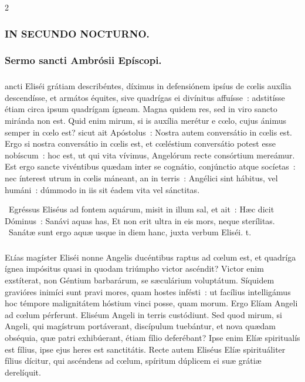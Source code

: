 \documentclass[9pt,twoside]{extarticle}
\begin{document}
\begin{multicols}{2}
\subsubsection*{\center \textsc{IN SECUNDO NOCTURNO.}}
\subsubsection*{\center Sermo sancti Ambrósii Epíscopi.}
\subsubsection*{\center {}}
ancti Eliséi grátiam describéntes, díximus in defensiónem ipsíus de cœlis auxília descendísse, et armátos équites, sive quadrígas ei divínitus affuísse~: adstitísse étiam circa ipsum quadrígam ígneam. Magna quidem res, sed in viro sancto miránda non est. Quid enim mirum, si is auxília merétur e cœlo, cujus ánimus semper in cœlo est? sicut ait Apóstolus~: Nostra autem conversátio in cœlis est. Ergo si nostra conversátio in cœlis est, et cœléstium conversátio potest esse nobíscum~: hoc est, ut qui vita vívimus, Angelórum recte consórtium mereámur. Est ergo sancte vivéntibus quædam inter se cognátio, conjúnctio atque socíetas~: nec ínterest utrum in cœlis máneant, an in terris~: Angélici sint hábitus, vel humáni~: dúmmodo in iis sit éadem vita vel sánctitas.

\begin{tightlist}{}
\item {}~Egréssus Eliséus ad fontem aquárum, misit in illum sal, et ait~: Hæc dicit Dóminus~: Sanávi aquas has, \textred{*} Et non erit ultra in eis mors, neque sterílitas. ~Sanátæ sunt ergo aquæ usque in diem hanc, juxta verbum Eliséi. t.
\end{tightlist}

\subsubsection*{\center {}}
\lettrine{E}lías magíster Eliséi nonne Angelis ducéntibus raptus ad cœlum est, et quadríga ígnea impósitus quasi in quodam triúmpho victor ascéndit? Victor enim exstíterat, non Géntium barbarárum, se sæculárium voluptátum. Síquidem gravióres inimíci sunt pravi mores, quam hostes infésti~: ut facílius intelligámus hoc témpore malignitátem hóstium vinci posse, quam morum. Ergo Elíam Angeli ad cœlum pérferunt. Eliséum Angeli in terris custódiunt. Sed quod mirum, si Angeli, qui magístrum portáverant, discípulum tuebántur, et nova quædam obséquia, quæ patri exhibúerant, étiam fílio deferébant? Ipse enim Elíæ spiritualís est fílius, ipse ejus heres est sanctitátis. Recte autem Eliséus Elíæ spirituáliter fílius dícitur, qui ascéndens ad cœlum, spíritum dúplicem ei suæ grátiæ derelíquit.


\end{multicols}
\end{document}

